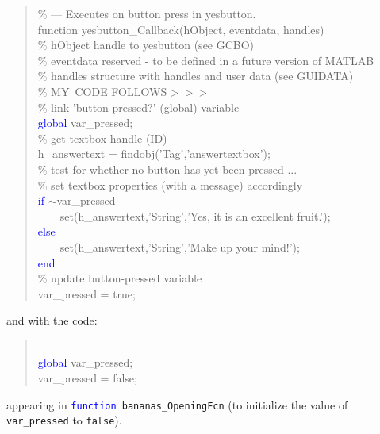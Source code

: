 \documentclass{tufte-book} %
\newenvironment{docspec}{\begin{quotation}\ttfamily\parskip0pt\parindent0pt\ignorespaces}{\end{quotation}}
\begin{document}
\begin{docspec}
\textcolor[rgb]{0,0.501961,0}{\% --- Executes on button press in yesbutton.}
\\function yesbutton\_Callback(hObject, eventdata, handles)
\textcolor[rgb]{0,0.501961,0}{\\\% hObject    handle to yesbutton (see GCBO)
\\\% eventdata  reserved - to be defined in a future version of MATLAB
\\\% handles    structure with handles and user data (see GUIDATA)}
\\\textcolor[rgb]{0,0.501961,0}{\% MY\ CODE FOLLOWS \textgreater\ \textgreater\ \textgreater}
\\\textcolor[rgb]{0,0.501961,0}{\% link 'button-pressed?' (global) variable}
\\\textcolor{blue}{global} \textcolor[rgb]{0,0.501961,1}{var\_pressed};
\\\textcolor[rgb]{0,0.501961,0}{\% get textbox handle (ID)}
\\h\_answertext = findobj('Tag','answertextbox');
\\\textcolor[rgb]{0,0.501961,0}{\% test for whether no button has yet been pressed ...}
\\\textcolor[rgb]{0,0.501961,0}{\% set textbox properties (with a message) accordingly}
\\\textcolor{blue}{if} \(\sim\)\textcolor[rgb]{0,0.501961,1}{var\_pressed}
\\ \ \ \ \   set(h\_answertext,\textcolor[rgb]{1,0,1}{'String'},\textcolor[rgb]{1,0,1}{'Yes, it is an excellent fruit.'});
\\\textcolor{blue}{else}
\\ \ \ \ \   set(h\_answertext,\textcolor[rgb]{1,0,1}{'String'},\textcolor[rgb]{1,0,1}{'Make up your mind!'});
\\\textcolor{blue}{end}
\\\textcolor[rgb]{0,0.501961,0}{\% update button-pressed variable}
\\\textcolor[rgb]{0,0.501961,1}{var\_pressed} = true;
\end{docspec}
and with the code:
\vspace{-4mm}
\begin{docspec}
\\\textcolor{blue}{global} \textcolor[rgb]{0,0.501961,1}{var\_pressed};\\
\textcolor[rgb]{0,0.501961,1}{var\_pressed} = false;
\end{docspec}
appearing in \texttt{\textcolor{blue}{function} bananas\_OpeningFcn} (to initialize the value of \texttt{var\_pressed} to \texttt{false}).
\end{document}
